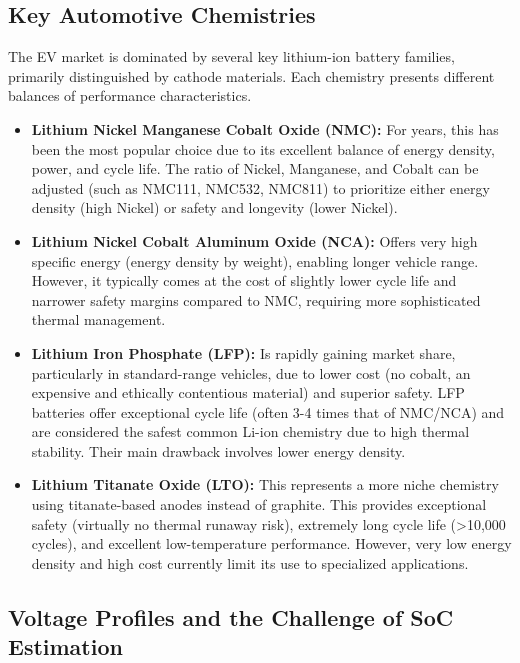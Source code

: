 \subsection{Key Automotive Chemistries}

The EV market is dominated by several key lithium-ion battery families, primarily distinguished by cathode materials. Each chemistry presents different balances of performance characteristics.

\begin{itemize}
    \item \textbf{Lithium Nickel Manganese Cobalt Oxide (NMC):} For years, this has been the most popular choice due to its excellent balance of energy density, power, and cycle life. The ratio of Nickel, Manganese, and Cobalt can be adjusted (such as NMC111, NMC532, NMC811) to prioritize either energy density (high Nickel) or safety and longevity (lower Nickel).
    
    \item \textbf{Lithium Nickel Cobalt Aluminum Oxide (NCA):} Offers very high specific energy (energy density by weight), enabling longer vehicle range. However, it typically comes at the cost of slightly lower cycle life and narrower safety margins compared to NMC, requiring more sophisticated thermal management.
    
    \item \textbf{Lithium Iron Phosphate (LFP):} Is rapidly gaining market share, particularly in standard-range vehicles, due to lower cost (no cobalt, an expensive and ethically contentious material) and superior safety. LFP batteries offer exceptional cycle life (often 3-4 times that of NMC/NCA) and are considered the safest common Li-ion chemistry due to high thermal stability. Their main drawback involves lower energy density.
    
    \item \textbf{Lithium Titanate Oxide (LTO):} This represents a more niche chemistry using titanate-based anodes instead of graphite. This provides exceptional safety (virtually no thermal runaway risk), extremely long cycle life (>10,000 cycles), and excellent low-temperature performance. However, very low energy density and high cost currently limit its use to specialized applications.
\end{itemize}

\subsection{Voltage Profiles and the Challenge of SoC Estimation}


